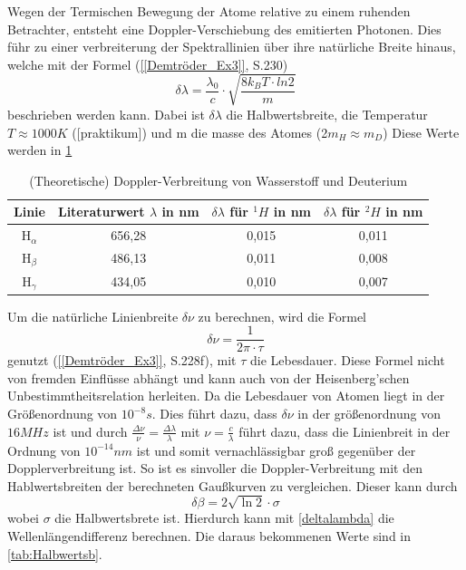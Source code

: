 Wegen der Termischen Bewegung der Atome relative zu einem ruhenden Betrachter, entsteht eine Doppler-Verschiebung des emitierten Photonen. 
Dies führ zu einer verbreiterung der Spektrallinien über ihre natürliche Breite hinaus, welche mit der Formel (\cref{[Demtröder_Ex3]}, S.230)
\begin{equation}
    \delta\lambda = \frac{\lambda_0}{c}\cdot \sqrt{\frac{8k_BT\cdot ln2}{m}}
\end{equation}
beschrieben werden kann.
Dabei ist $\delta\lambda$ die Halbwertsbreite, die Temperatur $T \approx 1000K$ ([praktikum]) und m die masse des Atomes (2$m_H \approx m_D$)
Diese Werte werden in \cref{tab:dopplerTemp}
\begin{table}[htbp]
    \centering
    \begin{tabular}{|c|c|c|c|}
    \hline
    Linie & Literaturwert $\lambda$ in nm & $\delta\lambda$ für $^1H$ in nm & $\delta\lambda$ für $^2H$ in nm \\
    \midrule
    H$_\alpha$ & 656,28 & 0,015 & 0,011 \\
    H$_\beta$ & 486,13 & 0,011 & 0,008 \\
    H$_\gamma$  & 434,05 & 0,010 & 0,007 \\
    \hline
    \end{tabular}
    \caption{(Theoretische) Doppler-Verbreitung von Wasserstoff und Deuterium}
    \label{tab:dopplerTemp}
\end{table}

Um die natürliche Linienbreite $\delta\nu$ zu berechnen, wird die Formel
\begin{equation}
    \delta \nu = \frac{1}{2\pi \cdot \tau}
\end{equation}
genutzt (\cref{[Demtröder_Ex3]}, S.228f), mit $\tau$ die Lebesdauer. 
Diese Formel nicht von fremden Einflüsse abhängt und kann auch von der Heisenberg'schen Unbestimmtheitsrelation herleiten.  
Da die Lebesdauer von Atomen liegt in der Größenordnung von $10^{-8}s$. 
Dies führt dazu, dass $\delta\nu$ in der größenordnung von $16MHz$  ist und durch $\frac{\Delta\nu}{\nu} = \frac{\Delta\lambda}{\lambda}$ mit $\nu = \frac{c}{\lambda}$ führt dazu, dass die Linienbreit in der Ordnung von $10^{-14}nm$ ist und somit vernachlässigbar groß gegenüber der Dopplerverbreitung ist.
So ist es sinvoller die Doppler-Verbreitung mit den Hablwertsbreiten der berechneten Gaußkurven zu vergleichen.
Dieser kann durch 
\begin{equation}
    \delta\beta = 2\sqrt{\ln{2}}\cdot \sigma
\end{equation}
wobei $\sigma$ die Halbwertsbrete ist.
Hierdurch kann mit \cref{deltalambda} die Wellenlängendifferenz berechnen.
Die daraus bekommenen Werte sind in \cref{tab:Halbwertsb}.

